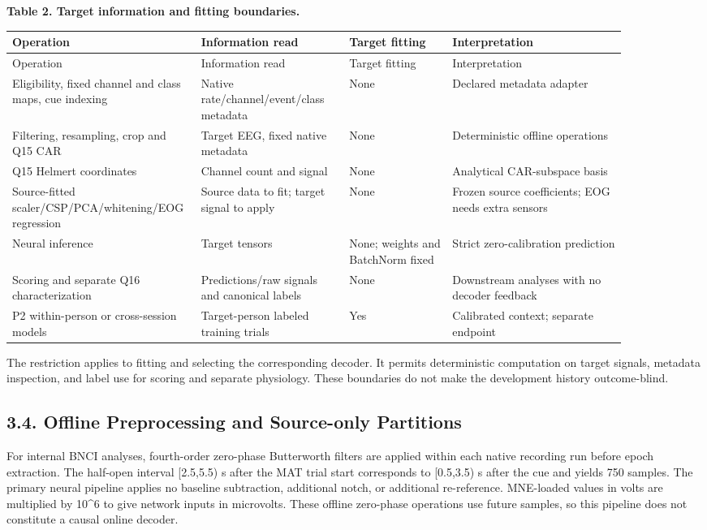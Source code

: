 \documentclass[11pt]{article}
\begin{document}
\par\medskip\noindent\textbf{Table 2. Target information and fitting boundaries.}
\begingroup\small\setlength{\tabcolsep}{4pt}
\begin{longtable}{@{}>{\raggedright\arraybackslash}p{0.200945\linewidth}>{\raggedright\arraybackslash}p{0.235591\linewidth}>{\raggedright\arraybackslash}p{0.166299\linewidth}>{\raggedright\arraybackslash}p{0.277165\linewidth}@{}}
\toprule
Operation & Information read & Target fitting & Interpretation \\
\midrule\endfirsthead
\toprule
Operation & Information read & Target fitting & Interpretation \\
\midrule\endhead
\bottomrule\endfoot
\bottomrule\endlastfoot
Eligibility, fixed channel and class maps, cue indexing & Native rate/channel/event/class metadata & None & Declared metadata adapter \\
Filtering, resampling, crop and Q15 CAR & Target EEG, fixed native metadata & None & Deterministic offline operations \\
Q15 Helmert coordinates & Channel count and signal & None & Analytical CAR-subspace basis \\
Source-fitted scaler/CSP/PCA/whitening/EOG regression & Source data to fit; target signal to apply & None & Frozen source coefficients; EOG needs extra sensors \\
Neural inference & Target tensors & None; weights and BatchNorm fixed & Strict zero-calibration prediction \\
Scoring and separate Q16 characterization & Predictions/raw signals and canonical labels & None & Downstream analyses with no decoder feedback \\
P2 within-person or cross-session models & Target-person labeled training trials & Yes & Calibrated context; separate endpoint \\
\end{longtable}
\noindent\footnotesize The restriction applies to fitting and selecting the corresponding decoder. It permits deterministic computation on target signals, metadata inspection, and label use for scoring and separate physiology. These boundaries do not make the development history outcome-blind.
\par\endgroup\medskip
\subsection*{3.4. Offline Preprocessing and Source-only Partitions}
For internal BNCI analyses, fourth-order zero-phase Butterworth filters are applied within each native recording run before epoch extraction. The half-open interval [2.5,5.5) s after the MAT trial start corresponds to [0.5,3.5) s after the cue and yields 750 samples. The primary neural pipeline applies no baseline subtraction, additional notch, or additional re-reference. MNE-loaded values in volts are multiplied by 10\textasciicircum{}6 to give network inputs in microvolts. These offline zero-phase operations use future samples, so this pipeline does not constitute a causal online decoder.
\end{document}
